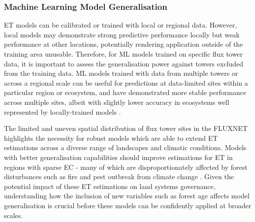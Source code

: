 \documentclass[paper=a4,fontsize=12pt]{scrartcl}
\begin{document}

\subsubsection{Machine Learning Model Generalisation}
ET models can be calibrated or trained with local or regional data. However, local models may demonstrate strong predictive performance locally but weak performance at other locations, potentially rendering application outside of the training area unusable. Therefore, for ML models trained on specific flux tower data, it is important to assess the generalisation power against towers excluded from the training data. ML models trained with data from multiple towers or across a regional scale can be useful for predictions at data-limited sites within a particular region or ecosystem, and have demonstrated more stable performance across multiple sites, albeit with slightly lower accuracy in ecosystems well represented by locally-trained models \parencite{ferreira2021generalizability}.
\par The limited and uneven spatial distribution of flux tower sites in the FLUXNET highlights the necessity for robust models which are able to extend ET estimations across a diverse range of landscapes and climatic conditions. Models with better generalisation capabilities should improve estimations for ET in regions with sparse EC - many of which are disproportionately affected by forest disturbances such as fire and pest outbreak from climate change \parencite{altman2024global,shi2024machine}. Given the potential impact of these ET estimations on land systems governance, understanding how the inclusion of new variables such as forest age affects model generalisation is crucial before these models can be confidently applied at broader scales.
\end{document}
